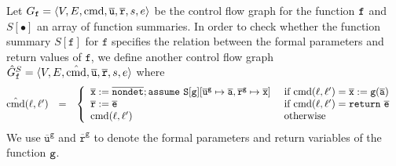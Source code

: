 
Let $G_{\mathtt{{f}}} = \langle V, E, \textmd{cmd}, \overline{\mathtt{u}}, \overline{\mathtt{r}},s,e \rangle$ be the
control flow graph for the function $\mathtt{{f}}$ and $S[\bullet]$ an
array of function summaries. In order to check whether the function
summary $S[{\mathtt{f}}]$ for $\mathtt{f}$ specifies the relation 
between the formal parameters and return values of $\mathtt{f}$, 
we define another control flow graph
$\hat{G}_{\mathtt{f}}^S = \langle V, E, \hat{\textmd{cmd}}, \overline{\mathtt{u}}, \overline{\mathtt{r}},s,e \rangle$ where
\begin{equation*}
\hspace{-0.2cm}
  \begin{array}{rcl}
    \hat{\textmd{cmd}} (\ell, \ell') & = &
    \left\{
      \begin{array}{ll}
        \overline{\mathtt{x}} := 
        \overline{\mathtt{nondet}};
        \mathtt{assume\ S[{\mathtt{g}}]}[
        \mathtt{\overline{u}^g} \mapsto \overline{\mathtt{a}},
        \mathtt{\overline{r}^g} \mapsto \overline{\mathtt{x}}]    
        &
        \textmd{ if } \textmd{cmd} (\ell, \ell') = 
        \overline{\mathtt{x}} := \mathtt{g} (\overline{\mathtt{a}})\\
		\mathtt{\overline{r}} := \overline{\mathtt{e}}
        &
        \textmd{ if } \textmd{cmd} (\ell, \ell') = \mathtt{return\ }
        \overline{\mathtt{e}}\\
        \textmd{cmd} (\ell, \ell')
        &
		\textmd{ otherwise}        
      \end{array}
    \right.
  \end{array}
\end{equation*}
We use $\mathtt{\overline{u}^g}$ and $\mathtt{\overline{r}^g}$ to denote the formal parameters and return variables of the function $\mathtt{{g}}$.

